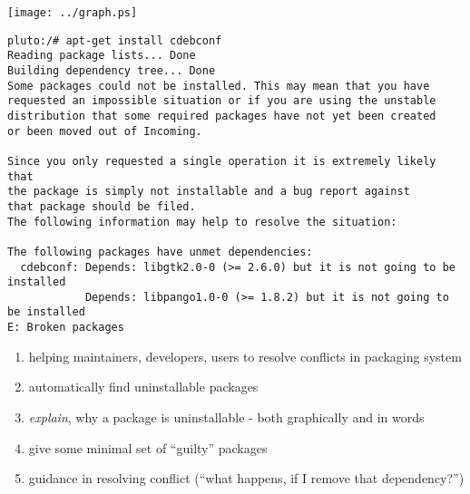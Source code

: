 

\texttt{[image: ../graph.ps]}


\begin{enumerate}
\begin{verbatim}
pluto:/# apt-get install cdebconf
Reading package lists... Done
Building dependency tree... Done
Some packages could not be installed. This may mean that you have
requested an impossible situation or if you are using the unstable
distribution that some required packages have not yet been created
or been moved out of Incoming.

Since you only requested a single operation it is extremely likely that
the package is simply not installable and a bug report against
that package should be filed.
The following information may help to resolve the situation:

The following packages have unmet dependencies:
  cdebconf: Depends: libgtk2.0-0 (>= 2.6.0) but it is not going to be installed
            Depends: libpango1.0-0 (>= 1.8.2) but it is not going to be installed
E: Broken packages
\end{verbatim}
\end{enumerate}



\begin{enumerate}
\item helping maintainers, developers, users to resolve conflicts in packaging system
\item automatically find uninstallable packages
\item \emph{explain}, why a package is uninstallable - both graphically and in words
\item give some minimal set of ``guilty'' packages
\item guidance in resolving conflict (``what happens, if I remove that dependency?'')
\end{enumerate}




